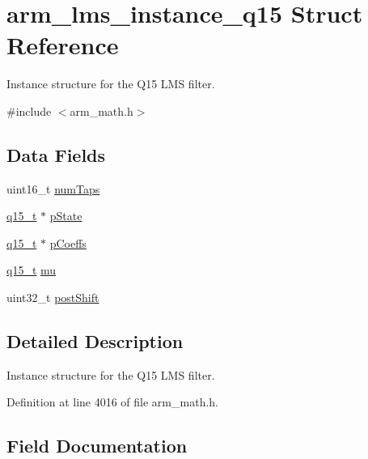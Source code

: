 \hypertarget{structarm__lms__instance__q15}{}\section{arm\+\_\+lms\+\_\+instance\+\_\+q15 Struct Reference}
\label{structarm__lms__instance__q15}


Instance structure for the Q15 L\+MS filter.  




{\ttfamily \#include $<$arm\+\_\+math.\+h$>$}

\subsection*{Data Fields}
\begin{DoxyCompactItemize}
\item 
uint16\+\_\+t \hyperlink{structarm__lms__instance__q15_a751941891e47f522a7f5375fe8990aac}{num\+Taps}
\item 
\hyperlink{arm__math_8h_ab5a8fb21a5b3b983d5f54f31614052ea}{q15\+\_\+t} $\ast$ \hyperlink{structarm__lms__instance__q15_ae29dfdb736374fcddaeaec4b7770170c}{p\+State}
\item 
\hyperlink{arm__math_8h_ab5a8fb21a5b3b983d5f54f31614052ea}{q15\+\_\+t} $\ast$ \hyperlink{structarm__lms__instance__q15_a7ca181a37f714d174445f486bebce26f}{p\+Coeffs}
\item 
\hyperlink{arm__math_8h_ab5a8fb21a5b3b983d5f54f31614052ea}{q15\+\_\+t} \hyperlink{structarm__lms__instance__q15_aab4745770bd667de040227eec1b5ff8d}{mu}
\item 
uint32\+\_\+t \hyperlink{structarm__lms__instance__q15_aa2cacddfc5e1d86905d7d31a18b1979b}{post\+Shift}
\end{DoxyCompactItemize}


\subsection{Detailed Description}
Instance structure for the Q15 L\+MS filter. 

Definition at line 4016 of file arm\+\_\+math.\+h.



\subsection{Field Documentation}
